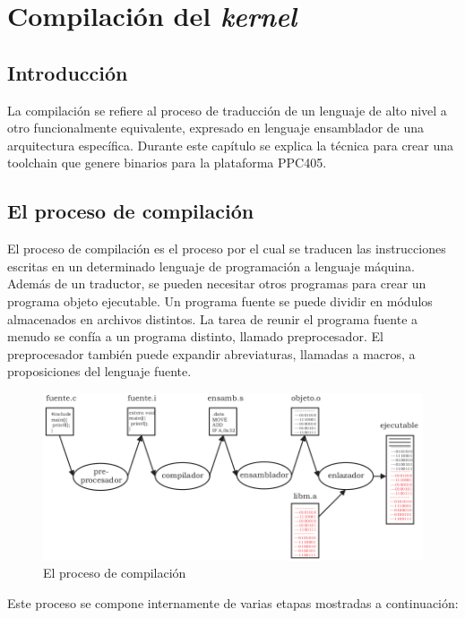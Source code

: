 \chapter{Compilación del \emph{kernel}}

\section{Introducción}

La compilación se refiere al proceso de traducción de un lenguaje de alto nivel
a otro funcionalmente equivalente, expresado en lenguaje ensamblador de una
arquitectura específica\cite{compilacion}. Durante este capítulo se explica la
técnica para crear una toolchain que genere binarios para la plataforma PPC405.


\section{El proceso de compilación}

El proceso de compilación es el proceso por el cual se traducen las
instrucciones escritas en un determinado lenguaje de programación a lenguaje
máquina. Además de un traductor, se pueden necesitar otros programas para crear
un programa objeto ejecutable. Un programa fuente se puede dividir en módulos
almacenados en archivos distintos. La tarea de reunir el programa fuente a
menudo se confía a un programa distinto, llamado preprocesador. El preprocesador
también puede expandir abreviaturas, llamadas a macros, a proposiciones del
lenguaje fuente.

\begin{figure}[ht]
 \centering
 \includegraphics[scale=.45]{./figuras/compilacion.png}
 \caption{El proceso de compilación}
 \label{El proceso de compilación}
\end{figure}

Este proceso se compone internamente de varias etapas mostradas a continuación:

